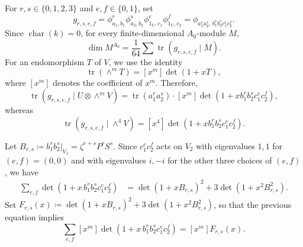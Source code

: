 \documentclass[12pt]{amsart}
\numberwithin{equation}{section}
\theoremstyle{remark}
\newcommand{\Char}{\operatorname{char}}
\begin{document}
For $r,s\in\{0,1,2,3\}$ and $e,f\in\{0,1\}$, set
\[
        g_{r,s,e,f}
        =
        \phi_{a_1,b_1}^r
        \phi_{a_2,b_2}^s
        \phi_{1_U,c_1}^e
        \phi_{1_U,c_2}^f
        =
        \phi_{a_1^r a_2^s,\,
        b_1^r b_2^s c_1^e c_2^f}.
\]
Since $\Char(k)=0$, for every finite-dimensional ${A_0}$-module $M$,
\begin{equation}\label{eq:tr-dim}
        \dim M^{A_0}
        =
        \frac{1}{64}
        \sum
        \operatorname{tr}(g_{r,s,e,f}\mid M).
\end{equation}
For an endomorphism $T$ of $V$, we use the identity
\[
        \operatorname{tr}(\wedge^m T) = [x^m]\det(1+xT),
\]
where $[x^m]$ denotes the coefficient of $x^m$. Therefore,
\begin{equation}\label{eq:tr1}
        \operatorname{tr}(g_{r,s,e,f}\mid U\otimes\wedge^m V)=\operatorname{tr}(a_1^r a_2^s)\cdot [x^m]\det(1+xb_1^r b_2^s c_1^e c_2^f ),
\end{equation}
whereas
\begin{equation}\label{eq:tr2}
        \operatorname{tr}(g_{r,s,e,f}\mid \wedge^4 V)
        =
        [x^4]\det(
        1+xb_1^r b_2^s c_1^e c_2^f
        ).
\end{equation}

Let $B_{r,s}\coloneqq b_1^r b_2^s|_{V_1}=\zeta^{r+s}P^rS^s$.
Since 
$c_1^e c_2^f$ acts on $V_2$ with eigenvalues $1,1$ for $(e,f)=(0,0)$ and with eigenvalues $i,-i$ for the other three choices of $(e,f)$, we have
\[
\begin{aligned}
        \sum_{e,f}
        \det(1+x\,b_1^r b_2^s c_1^e c_2^f)
        &=
        \det(1+xB_{r,s})^2
        +
        3\det(1+x^2B_{r,s}^2).
\end{aligned}
\]
Set $F_{r,s}(x)\coloneqq\det(1+xB_{r,s})^2+3\det(1+x^2B_{r,s}^2)$, so that the previous equation implies
\[
       \sum_{e,f}
        [x^m]\det(1+x\,b_1^r b_2^s c_1^e c_2^f)=[x^m]F_{r,s}(x).
\]
\end{document}
